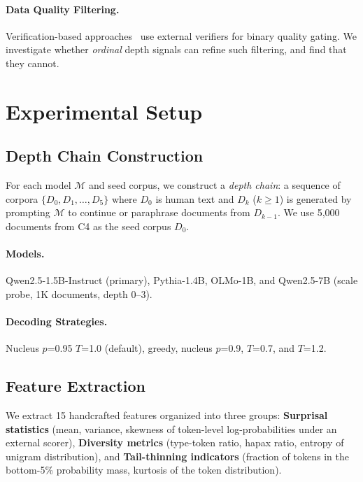 \documentclass[11pt,a4paper]{article}
\begin{document}
\paragraph{Data Quality Filtering.} Verification-based approaches~\cite{feng2024towards,yi2024on} use external verifiers for binary quality gating. We investigate whether \emph{ordinal} depth signals can refine such filtering, and find that they cannot.

\section{Experimental Setup}

\subsection{Depth Chain Construction}

For each model $\mathcal{M}$ and seed corpus, we construct a \emph{depth chain}: a sequence of corpora $\{D_0, D_1, \ldots, D_5\}$ where $D_0$ is human text and $D_k$ ($k \geq 1$) is generated by prompting $\mathcal{M}$ to continue or paraphrase documents from $D_{k-1}$.
We use 5,000 documents from C4 as the seed corpus $D_0$.

\paragraph{Models.} Qwen2.5-1.5B-Instruct (primary), Pythia-1.4B, OLMo-1B, and Qwen2.5-7B (scale probe, 1K documents, depth 0--3).

\paragraph{Decoding Strategies.} Nucleus $p$=0.95 $T$=1.0 (default), greedy, nucleus $p$=0.9, $T$=0.7, and $T$=1.2.

\subsection{Feature Extraction}

We extract 15 handcrafted features organized into three groups:
\textbf{Surprisal statistics} (mean, variance, skewness of token-level log-probabilities under an external scorer),
\textbf{Diversity metrics} (type-token ratio, hapax ratio, entropy of unigram distribution), and
\textbf{Tail-thinning indicators} (fraction of tokens in the bottom-5\% probability mass, kurtosis of the token distribution).
\end{document}
